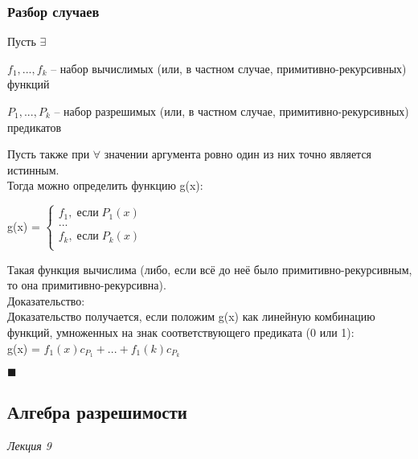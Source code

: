 \subsubsection{Разбор случаев}
    Пусть $\exists$
        
        $f_{1}, ... , f_{k}$ -- набор вычислимых (или, в частном случае, примитивно-рекурсивных) функций
        
        $P_{1}, ... , P_{k}$ -- набор разрешимых (или, в частном случае, примитивно-рекурсивных) предикатов
        
    Пусть также при $\forall$ значении аргумента ровно один из них точно является истинным.\\
    
    Тогда можно определить функцию g(x):
    
    g(x) = 
        $\left\{ 
            \begin{aligned} 
            f_{1},\; \text{если} \;P_{1}(x)\\
            ...\\
            f_{k},\; \text{если} \;P_{k}(x)\\
        \end{aligned}
        \right. $
    
    Такая функция вычислима (либо, если всё до неё было примитивно-рекурсивным, то она примитивно-рекурсивна).\\
    
    
    Доказательство:\\
    Доказательство получается, если положим g(x) как линейную комбинацию функций, умноженных на знак соответствующего предиката (0 или 1):\\
    g(x) = $f_{1}(x)c_{P_{1}} + ... + f_{1}(k)c_{P_{k}}$
    \begin{flushright}
        $\blacksquare$
    \end{flushright}


\subsection{Алгебра разрешимости}
\emph{Лекция 9}\\

